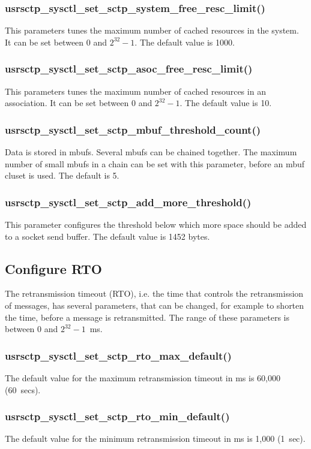 \documentclass[a4paper]{article}
\begin{document}
\subsubsection{usrsctp\_sysctl\_set\_sctp\_system\_free\_resc\_limit()}
This parameters tunes the maximum number of cached resources in the system. It can be set between 
0 and $2^{32}-1$. The default value is 1000.

\subsubsection{usrsctp\_sysctl\_set\_sctp\_asoc\_free\_resc\_limit()}
This parameters tunes the maximum number of cached resources in an association. It can be set between 
0 and $2^{32}-1$. The default value is 10.

\subsubsection{usrsctp\_sysctl\_set\_sctp\_mbuf\_threshold\_count()}
Data is stored in mbufs. Several mbufs can be chained together. The maximum number of small mbufs in a chain
can be set with this parameter, before an mbuf cluset is used. The default is 5.

\subsubsection{usrsctp\_sysctl\_set\_sctp\_add\_more\_threshold()}
This parameter configures the threshold below which more space should be added to a socket send buffer.
The default value is 1452 bytes.


\subsection{Configure RTO}
The retransmission timeout (RTO), i.e. the time that controls the retransmission of messages, has
several parameters, that can be changed, for example to shorten the time, before a message is
retransmitted. The range of these parameters is between 0 and $2^{32}-1$~ms. 

\subsubsection{usrsctp\_sysctl\_set\_sctp\_rto\_max\_default()}
The default value for the maximum retransmission timeout in ms is 60,000 (60~secs). 

\subsubsection{usrsctp\_sysctl\_set\_sctp\_rto\_min\_default()}
The default value for the minimum retransmission timeout in ms is 1,000 (1~sec). 
\end{document}
